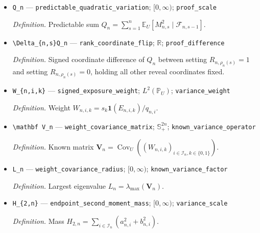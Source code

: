 \documentclass{article}
\begin{document}
\begin{itemize}
  \par\smallskip\noindent\emph{Definition.} Rank-\(s\) increment \(M_{n,s}=\mathbb E_U[F_n\mid\mathcal F_{n,s}]-\mathbb E_U[F_n\mid\mathcal F_{n,s-1}]\).
  \item \texttt{Q\_\allowbreak{}n} --- \texttt{predictable\_\allowbreak{}quadratic\_\allowbreak{}variation}; \([0,\infty)\); \texttt{proof\_\allowbreak{}scale}
  \par\smallskip\noindent\emph{Definition.} Predictable sum \(Q_n=\sum_{s=1}^n\mathbb E_U[M_{n,s}^2\mid\mathcal F_{n,s-1}]\).
  \item \texttt{\textbackslash{}\allowbreak{}Delta\_\allowbreak{}\{n,\allowbreak{}s\}\allowbreak{}Q\_\allowbreak{}n} --- \texttt{rank\_\allowbreak{}coordinate\_\allowbreak{}flip}; \(\mathbb R\); \texttt{proof\_\allowbreak{}difference}
  \par\smallskip\noindent\emph{Definition.} Signed coordinate difference of \(Q_n\) between setting \(R_{n,\rho_n(s)}=1\) and setting \(R_{n,\rho_n(s)}=0\), holding all other reveal coordinates fixed.
  \item \texttt{W\_\allowbreak{}\{n,\allowbreak{}i,\allowbreak{}k\}\allowbreak{}} --- \texttt{signed\_\allowbreak{}exposure\_\allowbreak{}weight}; \(L^2(\mathbb P_U)\); \texttt{variance\_\allowbreak{}weight}
  \par\smallskip\noindent\emph{Definition.} Weight \(W_{n,i,k}=s_k\mathbf 1(E_{n,i,k})/q_{n,i}\).
  \item \texttt{\textbackslash{}\allowbreak{}mathbf V\_\allowbreak{}n} --- \texttt{weight\_\allowbreak{}covariance\_\allowbreak{}matrix}; \(\mathbb S_+^{2n}\); \texttt{known\_\allowbreak{}variance\_\allowbreak{}operator}
  \par\smallskip\noindent\emph{Definition.} Known matrix \(\mathbf V_n=\operatorname{Cov}_U((W_{n,i,k})_{i\in\mathcal I_n,k\in\{0,1\}})\).
  \item \texttt{L\_\allowbreak{}n} --- \texttt{weight\_\allowbreak{}covariance\_\allowbreak{}radius}; \([0,\infty)\); \texttt{known\_\allowbreak{}variance\_\allowbreak{}factor}
  \par\smallskip\noindent\emph{Definition.} Largest eigenvalue \(L_n=\lambda_{\max}(\mathbf V_n)\).
  \item \texttt{H\_\allowbreak{}\{2,\allowbreak{}n\}\allowbreak{}} --- \texttt{endpoint\_\allowbreak{}second\_\allowbreak{}moment\_\allowbreak{}mass}; \([0,\infty)\); \texttt{variance\_\allowbreak{}scale}
  \par\smallskip\noindent\emph{Definition.} Mass \(H_{2,n}=\sum_{i\in\mathcal I_n}(a_{n,i}^2+b_{n,i}^2)\).

\end{itemize}
\end{document}
